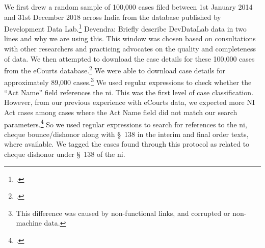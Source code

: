 \documentclass[12pt,a4paper]{article}
\begin{document}
		We first drew a random sample of 100,000 cases filed between 1st January 2014 and 31st December 2018 across India from the database published by Development Data Lab.\footcite{devdatalabs2021_eCourtsData} {\color{red} Devendra: Briefly describe DevDataLab data in two lines and why we are using this.} This window was chosen based on consultations with other researchers and practicing advocates on the quality and completeness of data. We then attempted to download the case details for these 100,000 cases from the eCourts database.\footcite{ecourts2022} We were able to download case details for approximately 89,000 cases.\footnote{This difference was caused by non-functional links, and corrupted or non-machine data.} We used regular expressions to check whether the ``Act Name'' field references the \gls{ni}. This was the first level of case classification. However, from our previous experience with eCourts data, we expected more NI Act cases among cases where the Act Name field did not match our search parameters.\footcite[The Act Name field sometimes does not contain the name of the substantive act, but rather the name of the procedural Act (e.g., CrPC) or, in rare cases, the subject matter of the case. This is mainly because case classification and nomenclature practices vary from state to state. However, in rare cases, the field is not populated or contains erroneous information. For details, please see,][]{damle2020_ecourtsData} So we used regular expressions to search for references to the \gls{ni}, cheque bounce/dishonor along with \S~138 in the interim and final order texts, where available. We tagged the cases found through this protocol as related to cheque dishonor under \S~138 of the \gls{ni}. 
		
\end{document}
